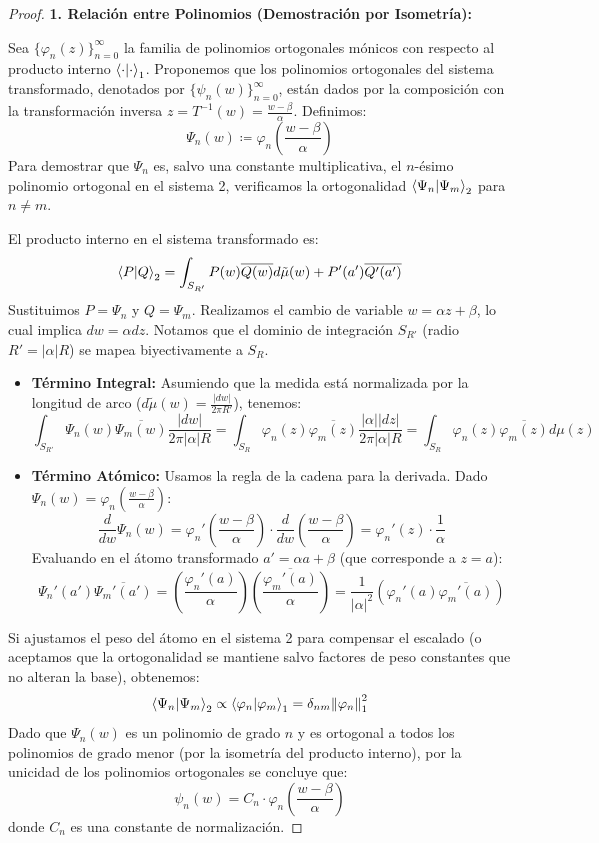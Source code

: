 \documentclass[12pt,a4paper]{article}
\begin{document}
\begin{proof}
\textbf{1. Relación entre Polinomios (Demostración por Isometría):}

Sea $\{\varphi_n(z)\}_{n=0}^\infty$ la familia de polinomios ortogonales mónicos con respecto al producto interno $\ip{\cdot}{\cdot}_1$. Proponemos que los polinomios ortogonales del sistema transformado, denotados por $\{\psi_n(w)\}_{n=0}^\infty$, están dados por la composición con la transformación inversa $z = T^{-1}(w) = \frac{w-\beta}{\alpha}$. Definimos:
$$ \Psi_n(w) \coloneqq \varphi_n\left( \frac{w-\beta}{\alpha} \right) $$
Para demostrar que $\Psi_n$ es, salvo una constante multiplicativa, el $n$-ésimo polinomio ortogonal en el sistema 2, verificamos la ortogonalidad $\ip{\Psi_n}{\Psi_m}_2$ para $n \neq m$.

El producto interno en el sistema transformado es:
$$ \ip{P}{Q}_2 = \int_{S_{R'}} P(w)\overline{Q(w)} d\tilde{\mu}(w) +  P'(a')\overline{Q'(a')} $$
Sustituimos $P = \Psi_n$ y $Q = \Psi_m$. Realizamos el cambio de variable $w = \alpha z + \beta$, lo cual implica $dw = \alpha dz$. Notamos que el dominio de integración $S_{R'}$ (radio $R' = |\alpha|R$) se mapea biyectivamente a $S_R$.
\begin{itemize}
    \item \textbf{Término Integral:} Asumiendo que la medida está normalizada por la longitud de arco ($d\tilde{\mu}(w) = \frac{|dw|}{2\pi R'}$), tenemos:
    $$ \int_{S_{R'}} \Psi_n(w)\overline{\Psi_m(w)} \frac{|dw|}{2\pi |\alpha|R} = \int_{S_R} \varphi_n(z)\overline{\varphi_m(z)} \frac{|\alpha||dz|}{2\pi |\alpha|R} = \int_{S_R} \varphi_n(z)\overline{\varphi_m(z)} d\mu(z) $$
    
    \item \textbf{Término Atómico:} Usamos la regla de la cadena para la derivada. Dado $\Psi_n(w) = \varphi_n(\frac{w-\beta}{\alpha})$:
    $$ \frac{d}{dw}\Psi_n(w) = \varphi_n'\left(\frac{w-\beta}{\alpha}\right) \cdot \frac{d}{dw}\left(\frac{w-\beta}{\alpha}\right) = \varphi_n'(z) \cdot \frac{1}{\alpha} $$
    Evaluando en el átomo transformado $a' = \alpha a + \beta$ (que corresponde a $z=a$):
    $$  \Psi_n'(a')\overline{\Psi_m'(a')} =  \left( \frac{\varphi_n'(a)}{\alpha} \right) \overline{\left( \frac{\varphi_m'(a)}{\alpha} \right)} = \frac{1}{|\alpha|^2} \left(  \varphi_n'(a)\overline{\varphi_m'(a)} \right) $$
\end{itemize}

Si ajustamos el peso del átomo en el sistema 2 para compensar el escalado (o aceptamos que la ortogonalidad se mantiene salvo factores de peso constantes que no alteran la base), obtenemos:
$$ \ip{\Psi_n}{\Psi_m}_2 \propto \ip{\varphi_n}{\varphi_m}_1 = \delta_{nm} \norm{\varphi_n}_1^2 $$
Dado que $\Psi_n(w)$ es un polinomio de grado $n$ y es ortogonal a todos los polinomios de grado menor (por la isometría del producto interno), por la unicidad de los polinomios ortogonales se concluye que:
$$ \psi_n(w) = C_n \cdot \varphi_n\left( \frac{w-\beta}{\alpha} \right) $$
donde $C_n$ es una constante de normalización.


\end{proof}
\end{document}
